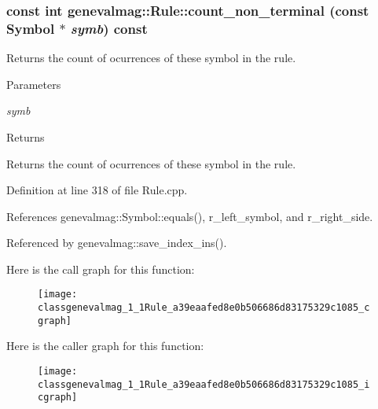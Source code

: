 \hypertarget{classgenevalmag_1_1Rule_a39eaafed8e0b506686d83175329c1085}{
\subsubsection[{count\_\-non\_\-terminal}]{\setlength{\rightskip}{0pt plus 5cm}const int genevalmag::Rule::count\_\-non\_\-terminal (const {\bf Symbol} $\ast$ {\em symb}) const}}
\label{classgenevalmag_1_1Rule_a39eaafed8e0b506686d83175329c1085}
Returns the count of ocurrences of these symbol in the rule. 
\begin{DoxyParams}{Parameters}
\item[{\em symb}]\end{DoxyParams}
\begin{DoxyReturn}{Returns}

\end{DoxyReturn}
Returns the count of ocurrences of these symbol in the rule. 

Definition at line 318 of file Rule.cpp.



References genevalmag::Symbol::equals(), r\_\-left\_\-symbol, and r\_\-right\_\-side.



Referenced by genevalmag::save\_\-index\_\-ins().



Here is the call graph for this function:\nopagebreak
\begin{figure}[H]
\begin{center}
\leavevmode
\texttt{[image: classgenevalmag\_1\_1Rule\_a39eaafed8e0b506686d83175329c1085\_cgraph]}
\end{center}
\end{figure}




Here is the caller graph for this function:\nopagebreak
\begin{figure}[H]
\begin{center}
\leavevmode
\texttt{[image: classgenevalmag\_1\_1Rule\_a39eaafed8e0b506686d83175329c1085\_icgraph]}
\end{center}
\end{figure}


